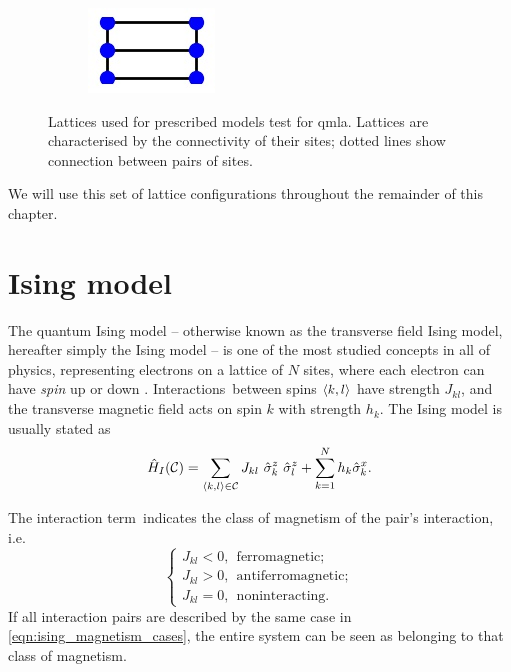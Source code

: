 \begin{figure}
\begin{center}
\begin{subfigure}{2.25cm}
        \caption{}
    \end{subfigure}
    \qquad
    \begin{subfigure}{2cm} 
        \includegraphics{theoretical_study/figures/lattices/_6_site_grid.jpg}        
        \caption{}
    \end{subfigure}
\end{center}
\caption[Lattices for prescribed QMLA exploration strategy]{
    Lattices used for prescribed models test for \gls{qmla}.
    Lattices are characterised by the connectivity of their sites; 
        dotted lines show connection between pairs of sites.                 
}
\label{fig:lattices}
\end{figure}

We will use this set of lattice configurations throughout the remainder of this chapter. 

\section{Ising model}\label{sec:ising}
The quantum Ising model -- otherwise known as the transverse field Ising model, hereafter simply the Ising model -- 
is one of the most studied concepts in all of physics, 
representing electrons on a lattice of $N$ sites, 
where each electron can have \emph{spin} up or down 
\cite{ising1925beitrag, onsager1944crystal, brush1967history}.
Interactions\footnotemark \ between spins ${ \langle k, l \rangle }$ have strength $J_{kl}$, 
and the transverse magnetic field acts on spin $k$ with strength $h_k$. 
The Ising model is usually stated as 
\begin{equation}
\label{eqn:ising_standard_form}
\hat{H}_I({ \mathcal{C}}) = \sum_{{ \langle k, l \rangle } \in \mathcal{C}} J_{kl}  \ \hat{\sigma}_k^z \ \hat{\sigma}_{l}^z + \sum_{k=1}^{N} h_k \hat{\sigma}_{k}^x.
\end{equation}

The interaction term\footnotemark \ indicates the class of magnetism of the pair's interaction, i.e. 
\begin{equation}
\label{eqn:ising_magnetism_cases}
\begin{cases}
    J_{kl} < 0, \ \ \textrm{ferromagnetic}; \\
    J_{kl} > 0, \ \ \textrm{antiferromagnetic}; \\
    J_{kl} = 0, \ \ \textrm{noninteracting}.
\end{cases}
\end{equation}
If all interaction pairs are described by the same case in \cref{eqn:ising_magnetism_cases}, 
the entire system can be seen as belonging to that class of magnetism. 

